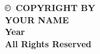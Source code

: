 \newpage
\thispagestyle{empty}

\begin{center}
{\bf \copyright~COPYRIGHT BY \\
YOUR NAME \\
Year \\
All Rights Reserved \\
}
\end{center}
